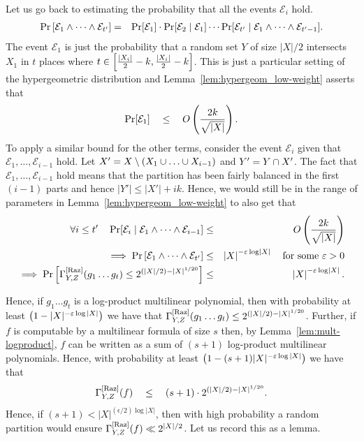 Let us go back to estimating the probability that all the events $\mathcal{E}_i$ hold.
\begin{eqnarray*}
  \Pr\left[\mathcal{E}_1 \wedge \dots \wedge \mathcal{E}_{t'}\right] & = & \Pr[\mathcal{E}_1] \cdot \Pr[\mathcal{E}_2 \mid \mathcal{E}_1] \cdots \Pr[\mathcal{E}_{t'}\mid \mathcal{E}_1 \wedge \dots \wedge \mathcal{E}_{t'-1}].
\end{eqnarray*}
The event $\mathcal{E}_1$ is just the probability that a random set $Y$ of size $|X|/2$ intersects $X_1$ in $t$ places where $t \in \left[\frac{|X_i|}{2} -k , \frac{|X_i|}{2} -k\right]$. This is just a particular setting of the hypergeometric distribution and Lemma~\ref{lem:hypergeom_low-weight} asserts that
$$
\Pr[\mathcal{E}_1] \quad \leq \quad O\left(\frac{2k}{\sqrt{|X|}}\right).
$$
To apply a similar bound for the other terms, consider the event $\mathcal{E}_i$ given that $\mathcal{E}_1, \dots, \mathcal{E}_{i-1}$ hold. Let $X' = X \setminus (X_1 \union \dots \union X_{i-1})$ and $Y' = Y\cap X'$. The fact that $\mathcal{E}_1,\dots, \mathcal{E}_{i-1}$ hold means that the partition has been fairly balanced in the first $(i-1)$ parts and hence $|Y'| \leq |X'| + ik$. Hence, we would still be in the range of parameters in Lemma~\ref{lem:hypergeom_low-weight} to also get that
\begin{eqnarray*}
  \forall i\leq t'\quad \Pr[\mathcal{E}_i\mid \mathcal{E}_1 \wedge \cdots \wedge \mathcal{E}_{i-1}] &\leq& O\left(\frac{2k}{\sqrt{|X|}}\right)\\
  \implies \Pr\left[\mathcal{E}_1\wedge \dots \wedge \mathcal{E}_{t'}\right] & \leq & \left|X\right|^{-\varepsilon \log \left|X\right|} \quad\text{for some $\varepsilon > 0$}  \\
  \implies \Pr\left[\Gamma^{\mathrm{[Raz]}}_{Y,Z}(g_1\dots g_t) \leq 2^{(|X|/2) - |X|^{1/20}}\right] & \leq & \left|X\right|^{-\varepsilon \log \left|X\right|}.
\end{eqnarray*}

\begin{sloppy}
	Hence, if $g_1\dots g_t$ is a log-product multilinear polynomial, 
	then with probability at least $\left(1 - |X|^{-\varepsilon \log |X|}\right)$ 
	we have that $\Gamma^{\mathrm{[Raz]}}_{Y,Z}(g_1\dots g_t) \leq 2^{(|X|/2) - |X|^{1/20}}$. 
	Further, if $f$ is computable by a multilinear formula of size $s$ then, 
	by Lemma~\ref{lem:mult-logproduct}, $f$ can be written as a sum of 
	$(s+1)$ log-product multilinear polynomials. Hence, with probability 
	at least $\left(1 - (s+1)|X|^{-\varepsilon \log |X|}\right)$ we have that
		$$\Gamma^{\mathrm{[Raz]}}_{Y,Z}(f) \quad \leq \quad (s+1) \cdot 2^{(|X|/2) - |X|^{1/20}}. $$
	Hence, if $(s+1) < |X|^{(\epsilon/2) \log |X|}$, then with high 
	probability a random partition would ensure 
	$\Gamma^{\mathrm{[Raz]}}_{Y,Z}(f) \ll 2^{|X|/2}$. Let us record this as a lemma.
\end{sloppy}

